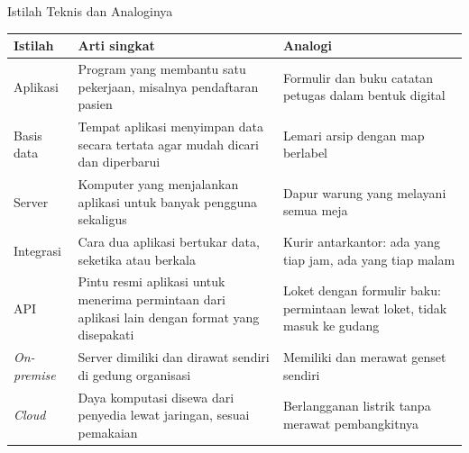 \documentclass[aspectratio=169, table, 12pt]{beamer}
\begin{document}
\begin{frame}{{\Large Istilah Teknis dan Analoginya}}
  \scriptsize
  \begin{tabularx}{\textwidth}{>{\raggedright\arraybackslash}p{1.8cm}
      >{\raggedright\arraybackslash}X >{\raggedright\arraybackslash}X}
    \hline
    \textbf{Istilah} & \textbf{Arti singkat} & \textbf{Analogi} \\
    \hline
    Aplikasi & Program yang membantu satu pekerjaan, misalnya pendaftaran pasien & Formulir dan buku catatan petugas dalam bentuk digital \\
    \hline
    Basis data & Tempat aplikasi menyimpan data secara tertata agar mudah dicari dan diperbarui & Lemari arsip dengan map berlabel \\
    \hline
    Server & Komputer yang menjalankan aplikasi untuk banyak pengguna sekaligus & Dapur warung yang melayani semua meja \\
    \hline
    Integrasi & Cara dua aplikasi bertukar data, seketika atau berkala & Kurir antarkantor: ada yang tiap jam, ada yang tiap malam \\
    \hline
    API & Pintu resmi aplikasi untuk menerima permintaan dari aplikasi lain dengan format yang disepakati & Loket dengan formulir baku: permintaan lewat loket, tidak masuk ke gudang \\
    \hline
    \textit{On-premise} & Server dimiliki dan dirawat sendiri di gedung organisasi & Memiliki dan merawat genset sendiri \\
    \hline
    \textit{Cloud} & Daya komputasi disewa dari penyedia lewat jaringan, sesuai pemakaian & Berlangganan listrik tanpa merawat pembangkitnya \\
    \hline
  \end{tabularx}
\end{frame}
\end{document}
